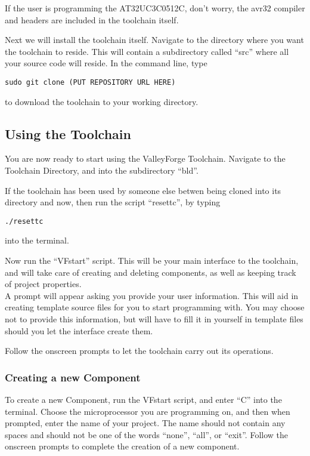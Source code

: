 \documentclass[a4paper, oneside, 11pt, titlepage, onecolumn, openright]{article}
\begin{document}
If the user is programming the AT32UC3C0512C, don't worry, the avr32 compiler and headers are included in the toolchain itself.

Next we will install the toolchain itself. Navigate to the directory where you want the toolchain to reside. This will contain a subdirectory called ``src'' where all your source code will reside.
In the command line, type \newline

\begin{lstlisting}
sudo git clone (PUT REPOSITORY URL HERE)
\end{lstlisting}
to download the toolchain to your working directory.


\subsection{Using the Toolchain }
			\label{ss:Using The Toolchain}
			
You are now ready to start using the ValleyForge Toolchain. Navigate to the Toolchain Directory, and into the subdirectory ``bld''. 

If the toolchain has been used by someone else betwen being cloned into its directory and now, then run the script ``resettc'', by typing
\begin{lstlisting}
./resettc
\end{lstlisting}
 into the terminal.
 
 Now run the ``VFstart'' script. This will be your main interface to the toolchain, and will take care of creating and deleting components, as well as keeping track of project properties.\\
 A prompt will appear asking you provide your user information. This will aid in creating template source files for you to start programming with. You may choose not to provide this information, but will have to fill it in yourself in template files should you let the interface create them.
 
 Follow the onscreen prompts to let the toolchain carry out its operations.

\subsubsection{Creating a new Component}
			\label{sss:Create New Component}
			
To create a new Component, run the VFstart script, and enter ``C'' into the terminal. Choose the microprocessor you are programming on, and then when prompted, enter the name of your project. The name should not contain any spaces and should not be one of the words ``none'', ``all'', or ``exit''. Follow the onscreen prompts to complete the creation of a new component. 
\end{document}
